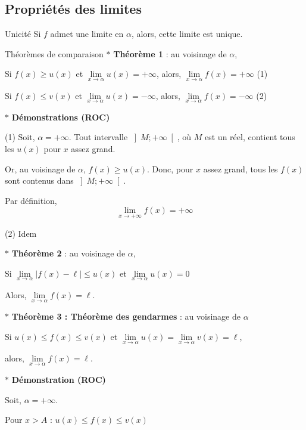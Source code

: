 \subsection{Propriétés des limites}

\medskip
\begin{bclogo}{Unicité}
Si $f$ admet une limite en $\alpha$, alors, cette limite est unique.
\end{bclogo}

\medskip

\begin{bclogo}{Théorèmes de comparaison}
$\ast$ \textbf{Théorème 1} : au voisinage de $\alpha$, 

Si $f(x)\geqslant u(x)$ et $\lim\limits_{x \to \alpha} u(x)=+ \infty$, alors, $\lim\limits_{x \to \alpha} f(x)=+\infty$ (1)

Si $f(x)\leqslant v(x)$ et $\lim\limits_{x \to \alpha} u(x)=- \infty$, alors, $\lim\limits_{x \to \alpha} f(x)=-\infty$ (2)

\medskip

$\ast$ \textbf{Démonstrations (ROC)}

(1) Soit, $\alpha =+\infty$. Tout intervalle $\left] M;+\infty\right[ $, où $M$ est un réel, contient tous les $u(x)$ pour $x$ assez grand.

Or, au voisinage de $\alpha$, $f(x)\geqslant u(x)$. Donc, pour $x$ assez grand, tous les $f(x)$ sont contenus dans $\left]M;+\infty \right[$.

Par définition,   \[\lim\limits_{x \to +\infty } f(x)=+\infty\]

(2) Idem

\medskip

$\ast$ \textbf{Théorème 2} : au voisinage de $\alpha$,

Si $\lim\limits_{x \to \alpha} |f(x)-\ell |\leqslant u(x)$ et $\lim\limits_{x \to \alpha} u(x) = 0$

Alors, $\lim\limits_{x \to \alpha} f(x)=\ell$.

\medskip
$\ast$ \textbf{Théorème 3 : Théorème des gendarmes} : au voisinage de $\alpha$

Si $u(x)\leqslant f(x) \leqslant v(x)$ et $\lim\limits_{x \to \alpha} u(x)=\lim\limits_{x \to \alpha} v(x)=\ell$,

alors, $\lim\limits_{x \to \alpha} f(x)=\ell$.

\medskip
$\ast$ \textbf{Démonstration (ROC)}

Soit, $\alpha=+\infty $.

Pour $x>A$ : $u(x)\leqslant f(x)\leqslant v(x)$


\end{bclogo}
